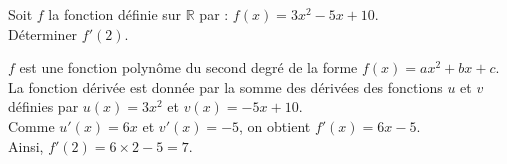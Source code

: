 \documentclass[a4paper,11pt,exos]{nsi} %
\begin{document}

\maketitle

\begin{exercice}
    Soit $f$ la fonction définie sur $\mathbb{R}$ par : $f(x)= 3x^2-5x+10$.\\
        Déterminer $f'(2)$.
\end{exercice}

$f$ est une fonction polynôme du second degré de la forme $f(x)=ax^2+bx+c$.\\
    La fonction dérivée est donnée par la somme des dérivées des fonctions $u$ et $v$ définies par $u(x)=3x^2$ et $v(x)=-5x+10$.\\
     Comme $u'(x)=6x$ et $v'(x)=-5$, on obtient  $f'(x)=6x-5$. \\
     Ainsi, $f'(2)=6\times 2-5=7$.
\end{document}
